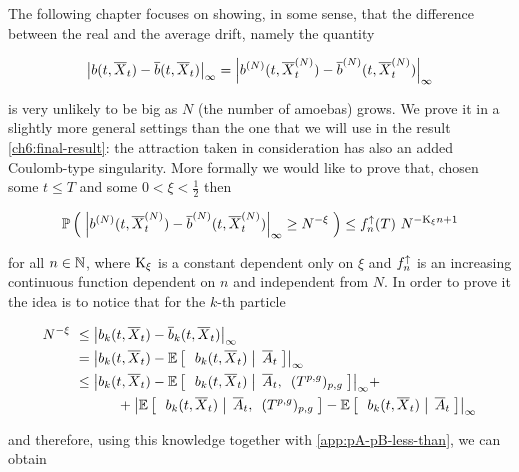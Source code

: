 \label{ch5}

The following chapter focuses on showing, in some sense, that the difference between the real and the average drift, namely the quantity

\begin{equation}
	{ \left| 
		b(t, \overline{X}_t)
		-
		\overline{b}(t, \overline{X}_t)
	 \right|_{\infty} }
	=
	{ \left| 
		b^{(N)}(t, \overline{X}_t^{(N)})
		-
		\overline{b}^{(N)}(t, \overline{X}_t^{(N)})
	 \right|_{\infty} }
\end{equation}

is very unlikely to be big as $N$ (the number of amoebas) grows.
We prove it in a slightly more general settings than the one that we will use in the result \ref{ch6:final-result}: the attraction taken in consideration has also an added Coulomb-type singularity.
More formally we would like to prove that, chosen some $t\leq T$ and  some $0<\xi < \frac{1}{2}$ then

\begin{equation}
	\mathbb{P} \left( \; 
		{ \left| 
			b^{(N)}(t, \overline{X}_t^{(N)})
			-
			\overline{b}^{(N)}(t, \overline{X}_t^{(N)})
	 \right|_{\infty} }
	\geq
	N^{-\xi}
	 \; \right)
	\leq
	f^\uparrow_n(T)\
	N^{-\text{K}_\xi n + 1}
\end{equation}

for all $n \in \mathbb{N}$, where $\text{K}_\xi$ is a constant dependent only on $\xi$ and $f^\uparrow_n$ is an increasing continuous function dependent on $n$ and independent from $N$.
In order to prove it the idea is to notice that for the $k$-th particle

\begin{align*}
	N^{-\xi}\
	&\leq
	{ \left| 
		b_k(t, \overline{X}_t)
		-
		\overline{b}_k(t, \overline{X}_t)
	 \right|_{\infty} }
	\\
	&=
	{ \left| 
		b_k(t, \overline{X}_t)
		-
		\mathbb{E} \left[ \; \left. \; b_k(t, \overline{X}_t) \; \right| \;  \overline{A}_t \; \right]
	 \right|_{\infty} }
	\\
	&\leq
	{ \left| 
		b_k(t, \overline{X}_t)
		-
		\mathbb{E} \left[ \; \left. \; b_k(t, \overline{X}_t) \; \right| \;  \overline{A}_t, \:\;(T^{p,g})_{p,g} \; \right]
	 \right|_{\infty} } +
	\\
	&\qquad\quad
	+
	{ \left| 
		\mathbb{E} \left[ \; \left. \; b_k(t, \overline{X}_t) \; \right| \;  \overline{A}_t, \:\;(T^{p,g})_{p,g} \; \right]
		-
		\mathbb{E} \left[ \; \left. \; b_k(t, \overline{X}_t) \; \right| \;  \overline{A}_t \; \right]
	 \right|_{\infty} }
\end{align*}

and therefore, using this knowledge together with \ref{app:pA-pB-less-than}, we can obtain

